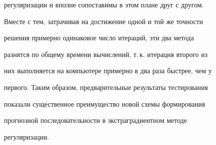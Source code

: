 регуляризации и вполне сопоставимы в этом плане друг с другом.


Вместе с тем, затрачивая на достижение одной и той же точности


решения примерно одинаковое число итераций, эти два метода


разнятся по общему времени вычислений, т.\,к. итерация второго из


них выполняется на компьютере примерно в два раза быстрее, чем у


первого. Таким образом, предварительные результаты тестирования


показали существенное преимущество новой схемы формирования


прогнозной последовательности в экстраградиентном методе


регуляризации.








